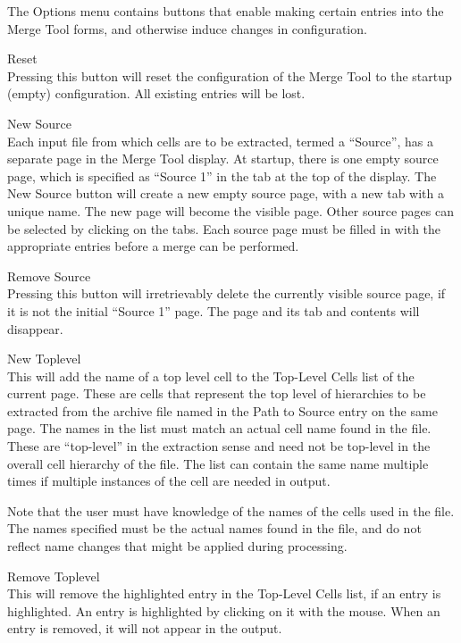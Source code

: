 The {\cb Options} menu contains buttons that enable making certain
entries into the {\cb Merge Tool} forms, and otherwise induce changes
in configuration.

\begin{description}
\item{\cb Reset}\\
Pressing this button will reset the configuration of the {\cb Merge
Tool} to the startup (empty) configuration.  All existing entries will
be lost.

\item{\cb New Source}\\
Each input file from which cells are to be extracted, termed a
``Source'', has a separate page in the {\cb Merge Tool} display.  At
startup, there is one empty source page, which is specified as
``Source 1'' in the tab at the top of the display.  The {\cb New
Source} button will create a new empty source page, with a new tab
with a unique name.  The new page will become the visible page.  Other
source pages can be selected by clicking on the tabs.  Each source
page must be filled in with the appropriate entries before a merge can
be performed.

\item{\cb Remove Source}\\
Pressing this button will irretrievably delete the currently visible
source page, if it is not the initial ``Source 1'' page.  The page and
its tab and contents will disappear.

\item{\cb New Toplevel}\\
This will add the name of a top level cell to the {\cb Top-Level
Cells} list of the current page.  These are cells that represent the
top level of hierarchies to be extracted from the archive file named
in the {\cb Path to Source} entry on the same page.  The names in the
list must match an actual cell name found in the file.  These are
``top-level'' in the extraction sense and need not be top-level in the
overall cell hierarchy of the file.  The list can contain the same
name multiple times if multiple instances of the cell are needed in
output.

Note that the user must have knowledge of the names of the cells used
in the file.  The names specified must be the actual names found in
the file, and do not reflect name changes that might be applied during
processing.

\item{\cb Remove Toplevel}\\
This will remove the highlighted entry in the {\cb Top-Level Cells}
list, if an entry is highlighted.  An entry is highlighted by clicking
on it with the mouse.  When an entry is removed, it will not appear in
the output.
\end{description}

